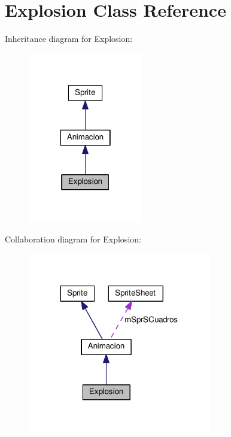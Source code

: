 \hypertarget{class_explosion}{}\section{Explosion Class Reference}
\label{class_explosion}


Inheritance diagram for Explosion\+:\nopagebreak
\begin{figure}[H]
\begin{center}
\leavevmode
\includegraphics[width=142pt]{class_explosion__inherit__graph}
\end{center}
\end{figure}


Collaboration diagram for Explosion\+:\nopagebreak
\begin{figure}[H]
\begin{center}
\leavevmode
\includegraphics[width=227pt]{class_explosion__coll__graph}
\end{center}
\end{figure}
